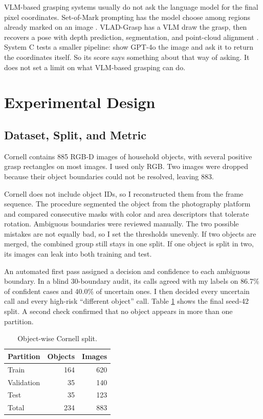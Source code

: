 \documentclass[10pt,conference,compsoc]{IEEEtran}
\begin{document}
VLM-based grasping systems usually do not ask the language model for the final
pixel coordinates. Set-of-Mark prompting has the model choose among regions
already marked on an image \cite{yang2024}. VLAD-Grasp has a VLM draw the
grasp, then recovers a pose with depth prediction, segmentation, and
point-cloud alignment \cite{kulshrestha2025}. System C tests a smaller
pipeline: show GPT-4o the image and ask it to return the coordinates itself.
So its score says something about that way of asking. It does not set a
limit on what VLM-based grasping can do.

\section{Experimental Design}

\subsection{Dataset, Split, and Metric}

Cornell contains 885 RGB-D images of household objects, with several positive
grasp rectangles on most images. I used only RGB. Two images were dropped
because their object boundaries could not be resolved, leaving 883.

Cornell does not include object IDs, so I reconstructed them from the frame
sequence. The procedure segmented the object from the photography platform
and compared consecutive masks with color and area descriptors that tolerate
rotation. Ambiguous boundaries were reviewed manually. The two possible mistakes are not equally bad, so I set the thresholds
unevenly. If two
objects are merged, the combined group still stays in one split. If one
object is split in two, its images can leak into both training and test.

An automated first pass assigned a decision and confidence to each ambiguous
boundary. In a blind 30-boundary audit, its calls agreed with my labels on
86.7\% of confident cases and 40.0\% of uncertain ones. I then decided every
uncertain call and every high-risk ``different object'' call. Table
\ref{tab:split} shows the final seed-42 split. A second check confirmed that
no object appears in more than one partition.

\begin{table}[t]
\caption{Object-wise Cornell split.}
\label{tab:split}
\centering
\begin{tabular}{lrr}
\toprule
Partition & Objects & Images \\
\midrule
Train & 164 & 620 \\
Validation & 35 & 140 \\
Test & 35 & 123 \\
\midrule
Total & 234 & 883 \\
\bottomrule
\end{tabular}
\end{table}
\end{document}
